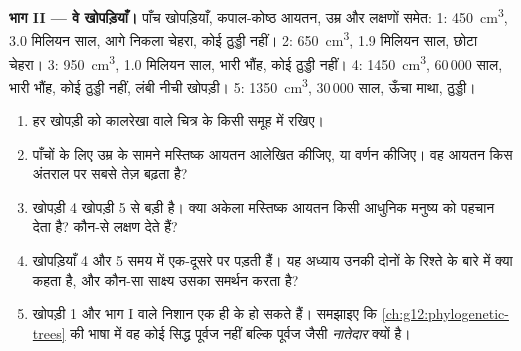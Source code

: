 \begin{problem}
\medskip
\noindent\textbf{भाग II --- वे खोपड़ियाँ।}
पाँच खोपड़ियाँ, कपाल-कोष्ठ आयतन, उम्र और लक्षणों समेत:
1: \qty{450}{cm^3}, 3.0 मिलियन साल, आगे निकला चेहरा, कोई ठुड्डी नहीं।
2: \qty{650}{cm^3}, 1.9 मिलियन साल, छोटा चेहरा।
3: \qty{950}{cm^3}, 1.0 मिलियन साल, भारी भौंह, कोई ठुड्डी नहीं।
4: \qty{1450}{cm^3}, 60\,000 साल, भारी भौंह, कोई ठुड्डी नहीं, लंबी नीची
खोपड़ी।
5: \qty{1350}{cm^3}, 30\,000 साल, ऊँचा माथा, ठुड्डी।
\begin{enumerate}[resume]
  \item हर खोपड़ी को कालरेखा वाले चित्र के किसी समूह में रखिए।
  \item पाँचों के लिए उम्र के सामने मस्तिष्क आयतन आलेखित कीजिए, या वर्णन
        कीजिए। वह आयतन किस अंतराल पर सबसे तेज़ बढ़ता है?
  \item खोपड़ी 4 खोपड़ी 5 से बड़ी है। क्या अकेला मस्तिष्क आयतन किसी आधुनिक
        मनुष्य को पहचान देता है? कौन-से लक्षण देते हैं?
  \item खोपड़ियाँ 4 और 5 समय में एक-दूसरे पर पड़ती हैं। यह अध्याय उनकी दोनों
         के रिश्ते के बारे में क्या कहता है, और कौन-सा साक्ष्य
        उसका समर्थन करता है?
  \item खोपड़ी 1 और भाग I वाले निशान एक ही  के हो सकते हैं। समझाइए कि
        \cref{ch:g12:phylogenetic-trees} की भाषा में वह  कोई सिद्ध
        पूर्वज नहीं बल्कि पूर्वज जैसी \emph{नातेदार} क्यों है।
\end{enumerate}


\end{problem}
